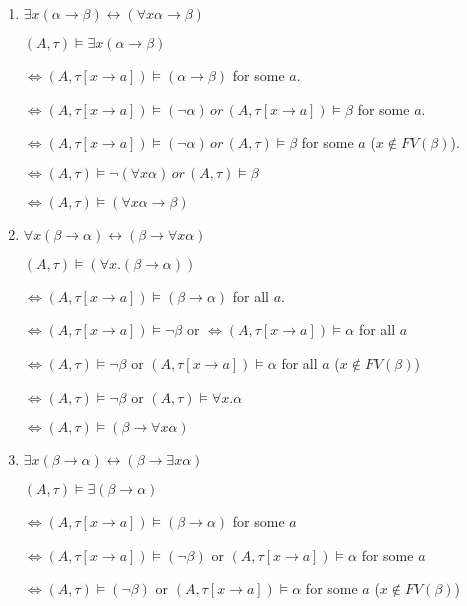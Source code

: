 \documentclass[12pt]{article}
\begin{document}
\begin{enumerate}
\begin{enumerate}
			\item
			$\exists x (\alpha \rightarrow \beta) \leftrightarrow
			(\forall x \alpha \rightarrow \beta)$
			
			$(A,\tau)\models\exists x (\alpha \rightarrow \beta)$
			
			$\Leftrightarrow (A,\tau[x\to a])\models(\alpha \rightarrow \beta)$ for some $a$.
			
			$\Leftrightarrow (A,\tau[x\to a])\models(\neg \alpha) \,or\, (A,\tau[x\to a])\models \beta$ for some $a$.
			
			$\Leftrightarrow (A,\tau[x\to a])\models(\neg \alpha) \,or\, (A,\tau)\models \beta$ for some $a$ ($x\not\in FV(\beta)$).
			
			$\Leftrightarrow (A,\tau)\models\neg(\forall x \alpha) \,or\, (A,\tau)\models \beta$ 
			
			$\Leftrightarrow (A,\tau)\models(\forall x \alpha\to  \beta)$ 
			
			\item
			$\forall x (\beta \rightarrow \alpha) \leftrightarrow
			(\beta \rightarrow \forall x \alpha)$
			
			$(A,\tau)\models (\forall x.(\beta\to\alpha))$
			
			$\Leftrightarrow (A,\tau[x\to a])\models(\beta\to\alpha)$ for all $a$.
			
			$\Leftrightarrow (A,\tau[x\to a])\models\neg\beta$ or $\Leftrightarrow (A,\tau[x\to a])\models \alpha$ for all $a$
				
				$\Leftrightarrow (A,\tau)\models\neg\beta$ or $ (A,\tau[x\to a])\models \alpha$ for all $a$ ($x\not\in FV(\beta)$)
				
					$\Leftrightarrow (A,\tau)\models\neg\beta$ or $ (A,\tau)\models \forall x.\alpha$ 
					
						$\Leftrightarrow (A,\tau)\models(\beta \rightarrow \forall x \alpha)$ 
			\item
			$\exists x (\beta \rightarrow \alpha) \leftrightarrow
			(\beta \rightarrow \exists x \alpha)$
			
			$(A,\tau)\models \exists(\beta \rightarrow \alpha)$
			
			$\Leftrightarrow (A,\tau[x\to a])\models(\beta\to\alpha)$ for some $a$
			
			$\Leftrightarrow (A,\tau[x\to a])\models(\neg \beta)$ or $(A,\tau[x\to a])\models\alpha$ for some $a$
			
			$\Leftrightarrow (A,\tau)\models(\neg \beta)$ or $(A,\tau[x\to a])\models\alpha$ for some $a$	($x\not\in FV(\beta)$)
			

\end{enumerate}
\end{enumerate}
\end{document}
